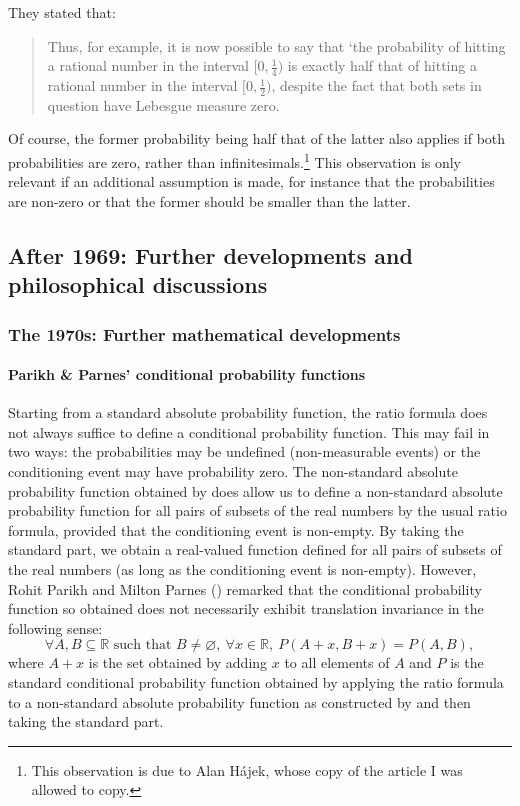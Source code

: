They stated that:
\begin{quote}
Thus, for example, it is now possible to say that `the probability of hitting a rational number in the interval $[0,\frac{1}{4})$ is exactly half that of hitting a rational number in the interval  $[0, \frac{1}{2})$, despite the fact that both sets in question have Lebesgue measure zero.
\end{quote}
Of course, the former probability being half that of the latter also applies if both probabilities are zero, rather than infinitesimals.\footnote{This observation is due to Alan H\'ajek, whose copy of the article I was allowed to copy.} This observation is only relevant if an additional assumption is made, for instance that the probabilities are non-zero or that the former should be smaller than the latter.

\subsection{After 1969: Further developments and philosophical discussions}
\subsubsection*{The 1970s: Further mathematical developments}
\paragraph{Parikh \& Parnes' conditional probability functions}
Starting from a standard absolute probability function, the ratio formula does not always suffice to define a conditional probability function. This may fail in two ways: the probabilities may be undefined (non-measurable events) or the conditioning event may have probability zero.
The non-standard absolute probability function obtained by \citet{BernsteinWattenberg:1969} does allow us to define a non-standard absolute probability function for all pairs of subsets of the real numbers by the usual ratio formula, provided that the conditioning event is non-empty. By taking the standard part, we obtain a real-valued function defined for all pairs of subsets of the real numbers (as long as the conditioning event is non-empty).
However, Rohit Parikh and Milton Parnes () remarked that the conditional probability function so obtained does not necessarily exhibit translation invariance in the following sense:
$$\forall A,B \subseteq \mathbb{R} \textrm{\ such\ that\ } B \neq \varnothing, \ \forall x \in \mathbb{R}, \ P(A+x,B+x)=P(A,B),$$
where $A+x$ is the set obtained by adding $x$ to all elements of $A$ and $P$ is the standard conditional probability function obtained by applying the ratio formula to a non-standard absolute probability function as constructed by \citet{BernsteinWattenberg:1969} and then taking the standard part.

